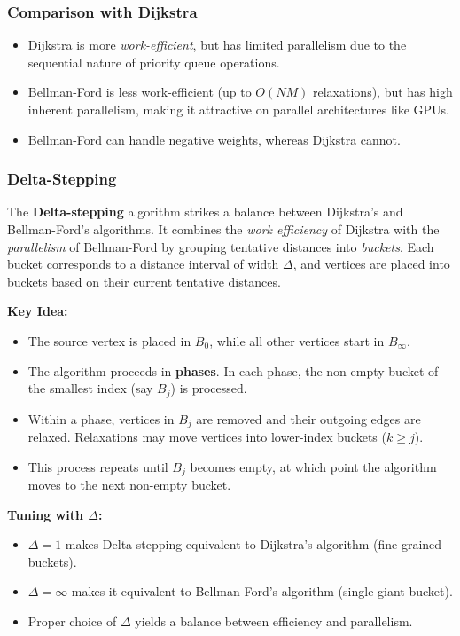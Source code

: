 \documentclass[12pt]{book}
\begin{document}
\subsubsection*{Comparison with Dijkstra}
\begin{itemize}
    \item Dijkstra is more \emph{work-efficient}, but has limited parallelism due to the sequential nature of priority queue operations.
    \item Bellman-Ford is less work-efficient (up to $O(NM)$ relaxations), but has high inherent parallelism, making it attractive on parallel architectures like GPUs.
    \item Bellman-Ford can handle negative weights, whereas Dijkstra cannot.
\end{itemize}


\subsubsection{Delta-Stepping}

The \textbf{Delta-stepping} algorithm strikes a balance between Dijkstra’s and Bellman-Ford’s algorithms.  
It combines the \emph{work efficiency} of Dijkstra with the \emph{parallelism} of Bellman-Ford by grouping tentative distances into \emph{buckets}. Each bucket corresponds to a distance interval of width $\Delta$, and vertices are placed into buckets based on their current tentative distances.

\medskip
\noindent
\textbf{Key Idea:}  
\begin{itemize}
    \item The source vertex is placed in $B_0$, while all other vertices start in $B_{\infty}$.
    \item The algorithm proceeds in \textbf{phases}. In each phase, the non-empty bucket of the smallest index (say $B_j$) is processed.
    \item Within a phase, vertices in $B_j$ are removed and their outgoing edges are relaxed. Relaxations may move vertices into lower-index buckets ($k \geq j$).
    \item This process repeats until $B_j$ becomes empty, at which point the algorithm moves to the next non-empty bucket.
\end{itemize}

\noindent
\textbf{Tuning with $\Delta$:}
\begin{itemize}
    \item $\Delta = 1$ makes Delta-stepping equivalent to Dijkstra’s algorithm (fine-grained buckets).
    \item $\Delta = \infty$ makes it equivalent to Bellman-Ford’s algorithm (single giant bucket).
    \item Proper choice of $\Delta$ yields a balance between efficiency and parallelism.
\end{itemize}
\end{document}

